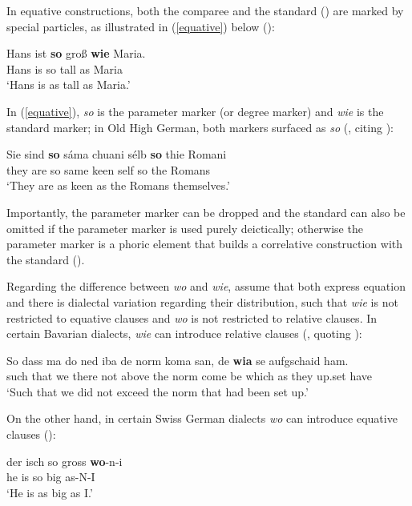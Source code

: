 In equative constructions, both the comparee and the standard (\citealt{haspelmathbuchholz1998}) are marked by special particles, as illustrated in (\ref{equative}) below (\citealt[150, ex. 42]{brandnerbraeuning2013}):

\ea \gll Hans ist \textbf{so} groß \textbf{wie} Maria. \label{equative}\\
Hans is so tall as Maria\\
\glt `Hans is as tall as Maria.'
\z

In (\ref{equative}), \textit{so} is the parameter marker (or degree marker) and \textit{wie} is the standard marker; in Old High German, both markers surfaced as \textit{so} (\citealt[150, ex. 43]{brandnerbraeuning2013}, citing \citealt{schlosser1998}):

\ea \gll Sie sind \textbf{so} s\'ama chuani s\'elb \textbf{so} thie Romani\\
they are so same keen self so the Romans\\
\glt `They are as keen as the Romans themselves.'
\z

Importantly, the parameter marker can be dropped and the standard can also be omitted if the parameter marker is used purely deictically; otherwise the parameter marker is a phoric element that builds a correlative construction with the standard (\citealt[150--151]{brandnerbraeuning2013}).

Regarding the difference between \textit{wo} and \textit{wie}, \citet[152]{brandnerbraeuning2013} assume that both express equation and there is dialectal variation regarding their distribution, such that \textit{wie} is not restricted to equative clauses and \textit{wo} is not restricted to relative clauses. In certain Bavarian dialects, \textit{wie} can introduce relative clauses (\citealt[153, ex. 50]{brandnerbraeuning2013}, quoting \citealt{eroms2005}):

\ea \gll So dass ma do ned iba de norm koma san, de \textbf{wia} se aufgschaid ham.\\
such that we there not above the norm come be which as they up.set have\\
\glt `Such that we did not exceed the norm that had been set up.'
\z

On the other hand, in certain Swiss German dialects \textit{wo} can introduce equative clauses (\citealt[153, ex. 51]{brandnerbraeuning2013}):

\ea \gll der isch so gross \textbf{wo}-n-i\\
he is so big as-N-I\\
\glt `He is as big as I.'
\z

